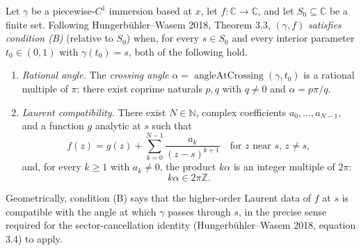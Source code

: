 \begin{definition}[Condition (B)]
  \label{def:condition-b}
  \leanok
  Let $\gamma$ be a piecewise-$C^{1}$ immersion based at $x$, let
  $f : \mathbb{C} \to \mathbb{C}$, and let $S_0 \subseteq \mathbb{C}$
  be a finite set. Following Hungerbühler--Wasem 2018, Theorem 3.3,
  $(\gamma, f)$ \emph{satisfies condition (B)} (relative to $S_0$)
  when, for every $s \in S_0$ and every interior parameter
  $t_0 \in (0,1)$ with $\gamma(t_0) = s$, both of the following
  hold.

  \begin{enumerate}
    \item \emph{Rational angle.} The \emph{crossing angle}
      $\alpha = \operatorname{angleAtCrossing}(\gamma, t_0)$ is a
      rational multiple of $\pi$: there exist coprime naturals
      $p, q$ with $q \ne 0$ and
      $\alpha = p\pi/q$.

    \item \emph{Laurent compatibility.} There exist
      $N \in \mathbb{N}$, complex coefficients
      $a_0, \ldots, a_{N-1}$, and a function $g$ analytic at $s$
      such that
      \[
        f(z) = g(z) + \sum_{k=0}^{N-1}
          \frac{a_k}{(z - s)^{k+1}}
        \quad \text{for } z \text{ near } s,\, z \ne s,
      \]
      and, for every $k \ge 1$ with $a_k \ne 0$, the product $k\alpha$
      is an integer multiple of $2\pi$:
      \[
        k \alpha \in 2\pi \mathbb{Z}.
      \]
  \end{enumerate}

  Geometrically, condition (B) says that the higher-order Laurent
  data of $f$ at $s$ is compatible with the angle at which $\gamma$
  passes through $s$, in the precise sense required for the
  sector-cancellation identity (Hungerbühler--Wasem 2018, equation
  3.4) to apply.
\end{definition}
